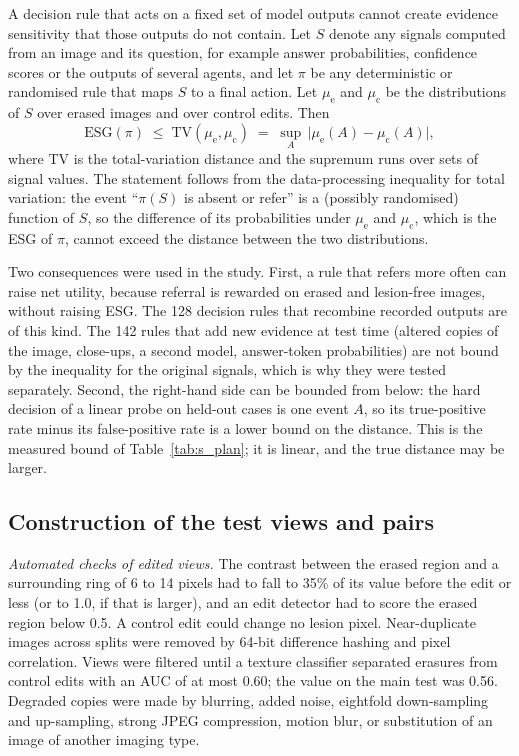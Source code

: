 A decision rule that acts on a fixed set of model outputs cannot create evidence sensitivity that those outputs do not contain. Let $S$ denote any signals computed from an image and its question, for example answer probabilities, confidence scores or the outputs of several agents, and let $\pi$ be any deterministic or randomised rule that maps $S$ to a final action. Let $\mu_{\mathrm{e}}$ and $\mu_{\mathrm{c}}$ be the distributions of $S$ over erased images and over control edits. Then
\begin{equation}
\label{eq:s_bound}
\mathrm{ESG}(\pi) \;\le\; \mathrm{TV}(\mu_{\mathrm{e}}, \mu_{\mathrm{c}}) \;=\; \sup_{A}\, \bigl|\mu_{\mathrm{e}}(A) - \mu_{\mathrm{c}}(A)\bigr| ,
\end{equation}
where TV is the total-variation distance and the supremum runs over sets of signal values. The statement follows from the data-processing inequality for total variation: the event ``$\pi(S)$ is absent or refer'' is a (possibly randomised) function of $S$, so the difference of its probabilities under $\mu_{\mathrm{e}}$ and $\mu_{\mathrm{c}}$, which is the ESG of $\pi$, cannot exceed the distance between the two distributions.

Two consequences were used in the study. First, a rule that refers more often can raise net utility, because referral is rewarded on erased and lesion-free images, without raising ESG. The 128 decision rules that recombine recorded outputs are of this kind. The 142 rules that add new evidence at test time (altered copies of the image, close-ups, a second model, answer-token probabilities) are not bound by the inequality for the original signals, which is why they were tested separately. Second, the right-hand side can be bounded from below: the hard decision of a linear probe on held-out cases is one event $A$, so its true-positive rate minus its false-positive rate is a lower bound on the distance. This is the measured bound of Table~\ref{tab:s_plan}; it is linear, and the true distance may be larger.

\subsection{Construction of the test views and pairs}
\label{sec:s_views}

\emph{Automated checks of edited views.} The contrast between the erased region and a surrounding ring of 6 to 14 pixels had to fall to 35\% of its value before the edit or less (or to 1.0, if that is larger), and an edit detector had to score the erased region below 0.5. A control edit could change no lesion pixel. Near-duplicate images across splits were removed by 64-bit difference hashing and pixel correlation. Views were filtered until a texture classifier separated erasures from control edits with an AUC of at most 0.60; the value on the main test was 0.56. Degraded copies were made by blurring, added noise, eightfold down-sampling and up-sampling, strong JPEG compression, motion blur, or substitution of an image of another imaging type.

